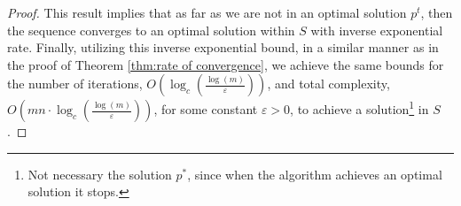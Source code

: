 \documentclass[10pt,a4paper]{amsart}
\begin{document}
\begin{proof}
This result implies that as far as we are not in an optimal solution $p^t$, then the sequence converges to an optimal solution within $S$ with inverse exponential rate. Finally, utilizing this inverse exponential bound, in a similar manner as in the proof of Theorem \ref{thm:rate of convergence},
we achieve the same bounds for the number of iterations, $O\left(\log_c \left(\frac{\log(m)}{\varepsilon}\right)\right)$, and total complexity, $O\left(m n \cdot \log_c \left(\frac{\log(m)}{\varepsilon}\right)\right)$, for some constant $\varepsilon>0$, to achieve a solution\footnote{Not necessary the solution $p^*$, since when the algorithm achieves an optimal solution it stops.} in $S$.
\end{proof}
\end{document}
